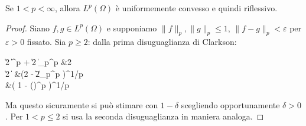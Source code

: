 \begin{theorem}
	Se $1 < p < \infty$, allora $L^p(\Omega)$ è uniformemente convesso e quindi riflessivo.
\end{theorem}
\begin{proof}
	Siano $f,g \in L^p(\Omega)$ e supponiamo $\|f\|_p, \|g\|_p \leq 1$, $\|f-g\|_p < \varepsilon$ per $\varepsilon>0$ fissato. Sia $p \geq 2$: dalla prima disuguaglianza di Clarkson:
	\begin{eqalign*}
		\left\| 2 \right\|^p + \left\| 2 \right\|_p^p &\leq {}2\\
		\left\| 2 \right\| &\leq \left(2 - \left\| 2\right\|_p^p \right)^{1/p}\\
		&\leq \left( 1 - \left(\right)^p \right)^{1/p}
	\end{eqalign*}
	Ma questo sicuramente si può stimare con $1-\delta$ scegliendo opportunamente $\delta > 0$. Per $1 < p \leq 2$ si usa la seconda disuguaglianza in maniera analoga.
\end{proof}


